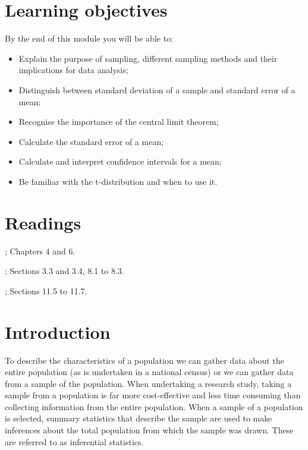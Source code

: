 \documentclass[
]{memoir}
\providecommand{\tightlist}{%
  \setlength{\itemsep}{0pt}\setlength{\parskip}{0pt}}
\begin{document}
\hypertarget{learning-objectives-2}{%
\section*{Learning objectives}\label{learning-objectives-2}}

By the end of this module you will be able to:

\begin{itemize}
\tightlist
\item
  Explain the purpose of sampling, different sampling methods and their implications for data analysis;
\item
  Distinguish between standard deviation of a sample and standard error of a mean;
\item
  Recognise the importance of the central limit theorem;
\item
  Calculate the standard error of a mean;
\item
  Calculate and interpret confidence intervals for a mean;
\item
  Be familiar with the t-distribution and when to use it.
\end{itemize}

\hypertarget{readings-2}{%
\section*{Readings}\label{readings-2}}

\citet{kirkwood_sterne01}; Chapters 4 and 6.

\citet{bland15}; Sections 3.3 and 3.4, 8.1 to 8.3.

\citet{juul_frydenberg14}; Sections 11.5 to 11.7.

\hypertarget{introduction-2}{%
\section{Introduction}\label{introduction-2}}

To describe the characteristics of a population we can gather data about the entire population (as is undertaken in a national census) or we can gather data from a sample of the population. When undertaking a research study, taking a sample from a population is far more cost-effective and less time consuming than collecting information from the entire population. When a sample of a population is selected, summary statistics that describe the sample are used to make inferences about the total population from which the sample was drawn. These are referred to as inferential statistics.
\end{document}

